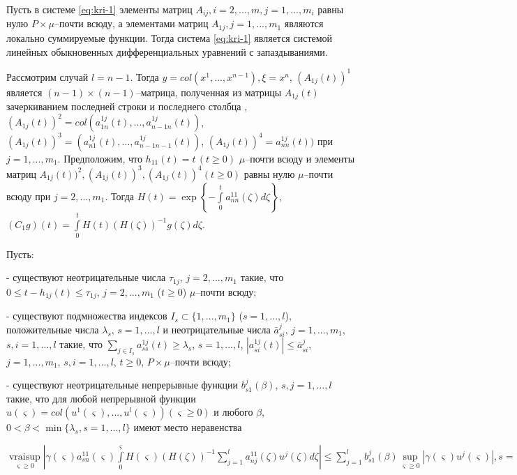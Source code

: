Пусть в системе \eqref{eq:kri-1} элементы матриц $A_{ij}, i = 2, ..., m, j = 1,
..., m_i$ равны нулю $P\times\mu$--почти всюду, а элементами матриц
$A_{1j}, j = 1, ..., m_1$ являются локально суммируемые функции.
Тогда система \eqref{eq:kri-1} является системой линейных обыкновенных
дифференциальных уравнений с запаздываниями.

Рассмотрим случай  $l = n-1$. Тогда $y = col(x^1,...,x^{n-1}), \xi =
x^n$, $(A_{1j}(t))^1$ является $(n-1)\times (n-1)$--матрица,
полученная из матрицы $A_{1j}(t)$ зачеркиванием последней строки и
последнего столбца , $(A_{1j}(t))^2 =
col(a^{1j}_{1n}(t),...,a^{1j}_{n-1 n}(t))$, $(A_{1j}(t))^3 =
(a^{1j}_{n1}(t),...,a^{1j}_{n-1n-1}(t))$, $(A_{1j}(t))^4 =
a^{1j}_{nn}(t))$ при $j = 1,...,m_1 $. Предположим, что $h_{11}(t) =
t \, (t \geq 0)$ $\mu $--почти всюду и элементы матриц
$A_{1j}(t))^2, (A_{1j}(t))^3, (A_{1j}(t))^4 (t \geq 0)$ равны нулю
$\mu $--почти всюду при $j = 2,...,m_1 $. Тогда $H(t) = \exp \left
\{-\int \limits _{0}^t a^{11}_{nn}(\zeta)d\zeta \right \}$,
$(C_1g)(t) = \int \limits _{0}^tH(t)(H(\zeta))^{-1}g(\zeta)d\zeta$.

Пусть:

- существуют неотрицательные числа $\tau_{1j}$, $j = 2,...,m_1$
такие, что $0 \leq
 t- h_{1j}(t) \leq \tau _{1j}$,  $j = 2,...,m_1$ ($t
 \geq 0$) $\mu $--почти всюду;

 - существуют подмножества индексов $I_s \subset \{1,..., m_1\}$ ($s
= 1,..., l$), положительные числа  $ \lambda _s$, $s = 1, ..., l$ и
неотрицательные числа $\bar a_{si}^j$, $j = 1, ..., m_1$, $s,i = 1,
 ..., l$ такие, что $\sum \limits_{j\in I_s}a^{1j}_{ss}(t) \geq
 \lambda _s$, $s = 1,...,l$, $|a^{1j}_{si}(t)|\leq \bar a^j_{si}$, $j =
 1,...,m_1$, $s,i = 1, ..., l$, $t \geq 0$, $P\times\mu$--почти
всюду;

- существуют неотрицательные непрерывные функции $b_{s1}^j(\beta)$,
$s, j = 1, ..., l$ такие, что для любой непрерывной функции
$u(\varsigma ) = col (u^1 (\varsigma), ..., u^l(\varsigma))
(\varsigma\geq 0)$ и любого $\beta$, $0 < \beta < \min \{\lambda _s,
s = 1,
..., l \}$ имеют  место неравенства\\
 \begin{center}
 $\mathrel {\mathop
 {vrai \sup}\limits _{\varsigma \geq 0}} \left |\gamma (\varsigma )a^{11}_{sn}(\varsigma )
\int \limits _{0}^\varsigma H(\varsigma)(H(\zeta))^{-1}\sum \limits
_{j=1}^l a_{nj}^{11}(\zeta)u^j(\zeta )d\zeta \right | \leq \sum
\limits_{j=1}^lb_{s1}^j(\beta)\sup \limits _{\varsigma \geq 0}\left
|\gamma (\varsigma)u^j(\varsigma)\right |, s = 1,...,l;$
\end{center}

